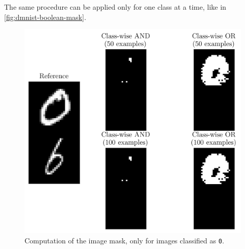 \documentclass[twocolumn]{../cs-classes/cs-classes}
\newcommand*{\1}{\digitsbb{1}}
\newcommand*{\0}{\digitsbb{0}}
\begin{document}
The same procedure can be applied only for one class at a time, like in \autoref{fig:dmnist-boolean-mask}.
\begin{figure}[H]
    \centering
    \includegraphics[width=.9\linewidth]{dmnist-boolean-mask.png}
    \caption{Computation of the image mask, only for images classified as \texttt{0}.}
    \label{fig:dmnist-boolean-mask}
\end{figure}





\end{document}
